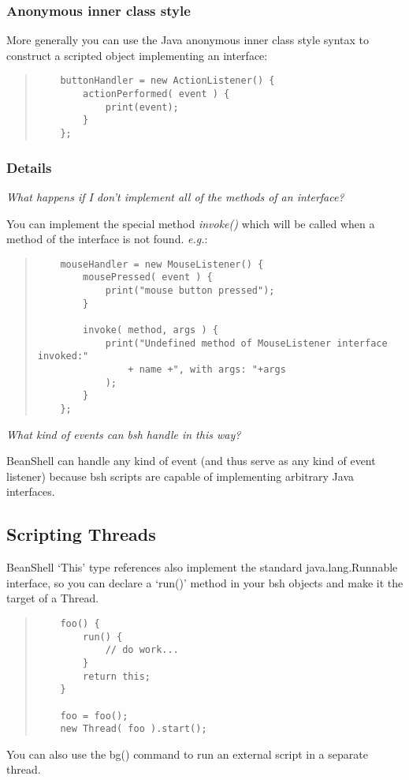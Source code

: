 \documentclass[twoside,11pt]{article}
\renewcommand{\_}{\texttt{\symbol{95}}}
\newcommand{\eg}{\textit{e.g.}}
\begin{document}
\subsubsection{Anonymous inner class style}
More generally you can use the Java anonymous inner class style syntax
to construct a scripted object implementing an interface:
\begin{quote}
\begin{verbatim}
    buttonHandler = new ActionListener() {
        actionPerformed( event ) {
            print(event);
        }
    };
\end{verbatim}
\end{quote}

\subsubsection{Details}
\textit{What happens if I don't implement all of the methods of an
interface?}

You can implement the special method \textit{invoke()} which will be
called when a method of the interface is not found. \eg:
\begin{quote}
\begin{verbatim}
    mouseHandler = new MouseListener() {
        mousePressed( event ) {
            print("mouse button pressed");
        }

        invoke( method, args ) {
            print("Undefined method of MouseListener interface invoked:"
                + name +", with args: "+args
            );
        }
    };
\end{verbatim}
\end{quote}

\textit{What kind of events can bsh handle in this way?}

BeanShell can handle any kind of event (and thus serve as any kind of
event listener) because bsh scripts are capable of implementing
arbitrary Java interfaces.

\subsection{Scripting Threads}

BeanShell `This' type references also implement the standard
java.lang.Runnable interface, so you can declare a `run()' method in
your bsh objects and make it the target of a Thread.
\begin{quote}
\begin{verbatim}
    foo() {
        run() {
            // do work...
        }
        return this;
    }

    foo = foo();
    new Thread( foo ).start();
\end{verbatim}
\end{quote}
You can also use the bg() command to run an external script in a separate
thread.
\end{document}
